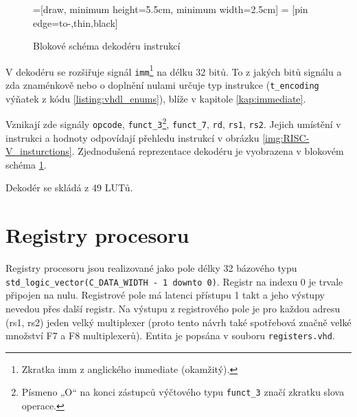 \documentclass[FM,BP]{tulthesis}
\begin{document}
\begin{figure}[h]
	\centering
	
	=[draw, minimum height=5.5cm, minimum width=2.5cm]
     = [pin edge={to-,thin,black}]
    
	
	\caption{Blokové schéma dekodéru instrukcí}
	\label{fig:decoder}
\end{figure}


V dekodéru se rozšiřuje signál \verb|imm|\footnote{Zkratka imm z anglického immediate (okamžitý).} na délku 32 bitů. To z jakých bitů signálu a zda znaménkově nebo o doplnění nulami určuje typ instrukce (\verb|t_encoding| výňatek z kódu \ref{listing:vhdl_enums}), blíže v kapitole \ref{kap:immediate}. 

Vznikají zde signály \verb|opcode|, \verb|funct_3|\footnote{Písmeno „O“ na konci zástupců výčtového typu \verb|funct_3| značí zkratku slova operace.}, \verb|funct_7|, \verb|rd|, \verb|rs1|, \verb|rs2|. 
Jejich umístění v instrukci a hodnoty odpovídají přehledu instrukcí v obrázku \ref{img:RISC-V_insturctions}. Zjednodušená reprezentace dekodéru je vyobrazena v blokovém schéma \ref{fig:decoder}.

Dekodér se skládá z 49 LUTů. 


\section{Registry procesoru}
Registry procesoru jsou realizované jako pole délky 32 bázového typu \verb|std_logic_vector(C_DATA_WIDTH - 1 downto 0)|. Registr na indexu 0 je trvale připojen na nulu. Registrové pole má latenci přístupu 1 takt a jeho výstupy nevedou přes další registr. Na výstupu z registrového pole je pro každou adresu (rs1, rs2) jeden velký multiplexer (proto tento návrh také spotřebová značně velké množství F7 a F8 multiplexerů). Entita je popsána v souboru \verb|registers.vhd|.
\end{document}
